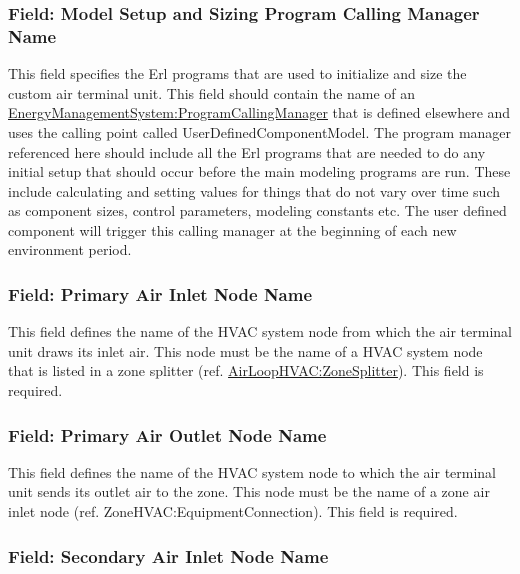 \subsubsection{Field: Model Setup and Sizing Program Calling Manager Name}\label{field-model-setup-and-sizing-program-calling-manager-name-1}

This field specifies the Erl programs that are used to initialize and size the custom air terminal unit. This field should contain the name of an \hyperref[energymanagementsystemprogramcallingmanager]{EnergyManagementSystem:ProgramCallingManager} that is defined elsewhere and uses the calling point called UserDefinedComponentModel. The program manager referenced here should include all the Erl programs that are needed to do any initial setup that should occur before the main modeling programs are run. These include calculating and setting values for things that do not vary over time such as component sizes, control parameters, modeling constants etc. The user defined component will trigger this calling manager at the beginning of each new environment period.

\subsubsection{Field: Primary Air Inlet Node Name}\label{field-primary-air-inlet-node-name-1-000}

This field defines the name of the HVAC system node from which the air terminal unit draws its inlet air. This node must be the name of a HVAC system node that is listed in a zone splitter (ref. \hyperref[airloophvaczonesplitter]{AirLoopHVAC:ZoneSplitter}). This field is required.

\subsubsection{Field: Primary Air Outlet Node Name}\label{field-primary-air-outlet-node-name-1-000}

This field defines the name of the HVAC system node to which the air terminal unit sends its outlet air to the zone. This node must be the name of a zone air inlet node (ref. ZoneHVAC:EquipmentConnection). This field is required.

\subsubsection{Field: Secondary Air Inlet Node Name}\label{field-secondary-air-inlet-node-name-1-001}

